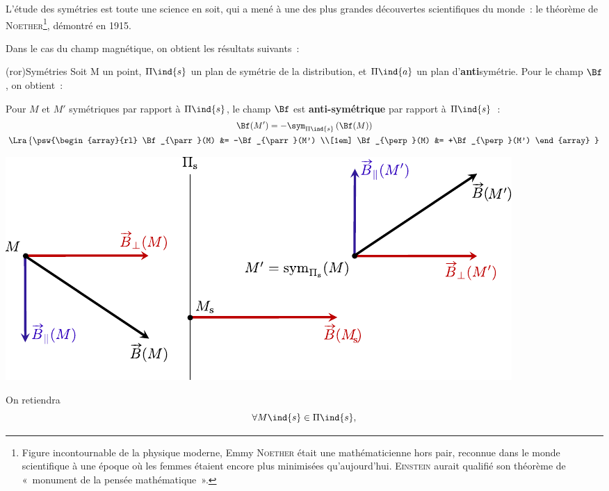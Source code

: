 \documentclass[../../main/main.tex]{subfiles}
\begin{document}
L'étude des symétries est toute une science en soit, qui a mené à une des plus
grandes découvertes scientifiques du monde~: le théorème de
\textsc{Noether}\footnote{Figure incontournable de la physique moderne, Emmy
  \textsc{Noether} était une mathématicienne hors pair, reconnue dans le monde
  scientifique à une époque où les femmes étaient encore plus minimisées
  qu'aujourd'hui. \textsc{Einstein} aurait qualifié son théorème de «~monument
de la pensée mathématique~».}, démontré en 1915.

Dans le cas du champ magnétique, on obtient les résultats suivants~:

\begin{tcb*}(ror){Symétries}
	Soit M un point, $\Pi\ind{s}$ un plan de symétrie de la distribution, et
	$\Pi\ind{a}$ un plan d'\textbf{anti}symétrie. Pour le champ $\Bf$, on
  obtient~:
  \smallbreak
  \begin{isd}[sidebyside align=top]
    Pour $M$ et $M'$ symétriques par rapport à $\Pi\ind{s}$, le champ $\Bf$ est
    \textbf{anti-symétrique} par rapport à $\Pi\ind{s}$~:
    \begin{gather*}
      \Bf(M') = -\sym_{\Pi\ind{s}} \left(\Bf(M)\right)
      \\\Lra
      \left\{ 
        \psw{%
                  \begin{array}{rl}
                  \Bf_{\parr}(M) &= -\Bf_{\parr}(M')
                  \\[1em]
                  \Bf_{\perp}(M) &= +\Bf_{\perp}(M')
                \end{array}
        }%
       \right.
    \end{gather*}
    \begin{center}
      \includegraphics[width=\linewidth]{Psym_B}
    \end{center}
    On retiendra
    \[
		\setlength{\fboxsep}{3mm}
        \forall M\ind{s} \in \Pi\ind{s},
\]
\end{isd}
\end{tcb*}
\end{document}
